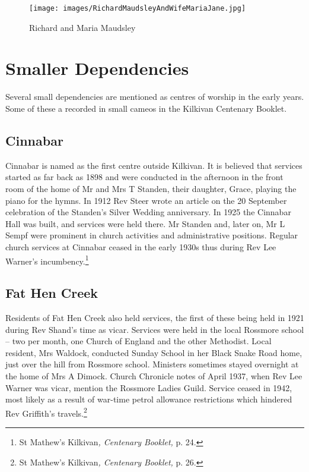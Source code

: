 \begin{figure}[!h]
\begin{center}
\texttt{[image: images/RichardMaudsleyAndWifeMariaJane.jpg]}
\caption{Richard and Maria Maudsley}
\end{center}
\end{figure}


\section{Smaller Dependencies}

Several small dependencies are mentioned as centres of worship in the
early years. Some of these a recorded in small cameos in the Kilkivan
Centenary Booklet.

\subsection{Cinnabar}

Cinnabar is named as the first centre outside Kilkivan. It is believed
that services started as far back as 1898 and were conducted in the
afternoon in the front room of the home of Mr and Mrs T Standen, their
daughter, Grace, playing the piano for the hymns. In 1912 Rev Steer
wrote an article on the 20 September celebration of the Standen's Silver
Wedding anniversary. In 1925 the Cinnabar Hall was built, and services
were held there. Mr Standen and, later on, Mr L Sempf were prominent in
church activities and administrative positions. Regular church services
at Cinnabar ceased in the early 1930s thus during Rev Lee Warner's
incumbency.\footnote{St Mathew's Kilkivan\emph{, Centenary Booklet,} p.
  24.}

\subsection{Fat Hen Creek}

Residents of Fat Hen Creek also held services, the first of these being
held in 1921 during Rev Shand's time as vicar. Services were held in the
local Rossmore school -- two per month, one Church of England and the
other Methodist. Local resident, Mrs Waldock, conducted Sunday School in
her Black Snake Road home, just over the hill from Rossmore school.
Ministers sometimes stayed overnight at the home of Mrs A Dimock. Church
Chronicle notes of April 1937, when Rev Lee Warner was vicar, mention
the Rossmore Ladies Guild. Service ceased in 1942, most likely as a
result of war-time petrol allowance restrictions which hindered Rev
Griffith's travels.\footnote{St Mathew's Kilkivan\emph{, Centenary
  Booklet,} p. 26.}

